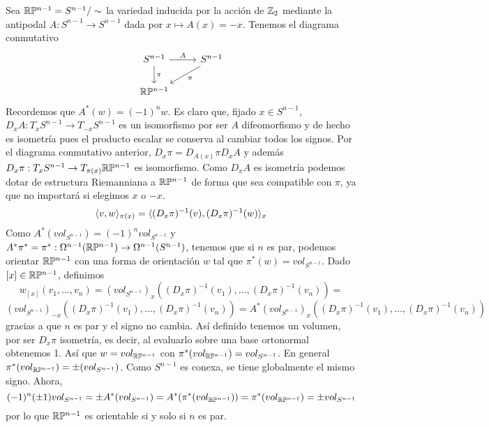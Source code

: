 \documentclass[CV.tex]{subfiles}
\begin{document}
\begin{ej}
Sea $\mathbb{R} \mathbb{P}^{n-1}=S^{n-1}/\sim$ la variedad inducida por la acción de $\mathbb{Z}_2$ mediante la antipodal $A:S^{n-1}\to S^{n-1}$ dada por $x\mapsto A(x)=-x$. Tenemos el diagrama conmutativo
\[
\begin{tikzcd}
S^{n-1}\arrow[r,"A"]\arrow[d, "\pi"] & S^{n-1}\arrow[dl, "\pi"]\\
\R\PP^{n-1} & 
\end{tikzcd}
\]
Recordemos que $A^*(w)=(-1)^nw$. Es claro que, fijado $x\in S^{n-1}$, $D_xA: T_xS^{n-1}\to T_{-x}S^{n-1}$ es un isomorfismo por ser $A$ difeomorfismo y de hecho es isometría pues el producto escalar se conserva al cambiar todos los signos. Por el diagrama conmutativo anterior, $D_x\pi=D_{A(x)}\pi D_xA$ y además $D_x\pi: T_xS^{n-1}\to T_{\pi(x)}\mathbb{R}\mathbb{P}^{n-1}$ es isomorfismo. Como $D_xA$ es isometría podemos dotar de estructura Riemanniana a $\mathbb{R}\mathbb{P}^{n-1}$ de forma que sea compatible con $\pi$, ya que no importará si elegimos $x$ o $-x$.
\[
\langle{v,w}\rangle_{\pi(x)}=\langle{(D_x\pi)^{-1}(v),(D_x\pi)^{-1}(w)}\rangle_x
\]
Como $A^*(vol_{S^{n-1}})=(-1)^nvol_{S^{n-1}}$ y $A^*\pi^*=\pi^*:\Omega^{n-1}(\mathbb{R}\mathbb{P}^{n-1})\to\Omega^{n-1}(S^{n-1})$, tenemos que si $n$ es par, podemos orientar $\mathbb{R}\mathbb{P}^{n-1}$ con una forma de orientación $w$ tal que $\pi^*(w)=vol_{S^{n-1}}$. Dado $[x]\in\mathbb{R}\mathbb{P}^{n-1}$, definimos
\[
w_{[x]}(v_1,\dots, v_n)=(vol_{S^{n-1}})_x((D_x\pi)^{-1}(v_1),\dots, (D_x\pi)^{-1}(v_n))=
\] 
\[
(vol_{S^{n-1}})_{-x}((D_x\pi)^{-1}(v_1),\dots, (D_x\pi)^{-1}(v_n))=A^*(vol_{S^{n-1}})_x((D_x\pi)^{-1}(v_1),\dots, (D_x\pi)^{-1}(v_n))
\]
gracias a que $n$ es par y el signo no cambia. Así definido tenemos un volumen, por ser $D_x\pi$ isometría, es decir, al evaluarlo sobre una base ortonormal obtenemos 1. Así que $w=vol_{\mathbb{R}\mathbb{P}^{n-1}}$ con $\pi^*(vol_{\mathbb{R}\mathbb{P}^{n-1}})=vol_{S^{n-1}}$. En general $\pi^*(vol_{\mathbb{R}\mathbb{P}^{n-1}})=\pm (vol_{S^{n-1}})$. Como $S^{n-1}$ es conexa, se tiene globalmente el mismo signo. Ahora,
\[
(-1)^n(\pm 1)vol_{S^{n-1}}=\pm A^*(vol_{S^{n-1}})=A^*(\pi^*(vol_{\mathbb{R}\mathbb{P}^{n-1}}))=\pi^*(vol_{\mathbb{R}\mathbb{P}^{n-1}})=\pm vol_{S^{n-1}}
\]
por lo que $\mathbb{R}\mathbb{P}^{n-1}$ es orientable si y solo si $n$ es par.
\end{ej}
\end{document}
